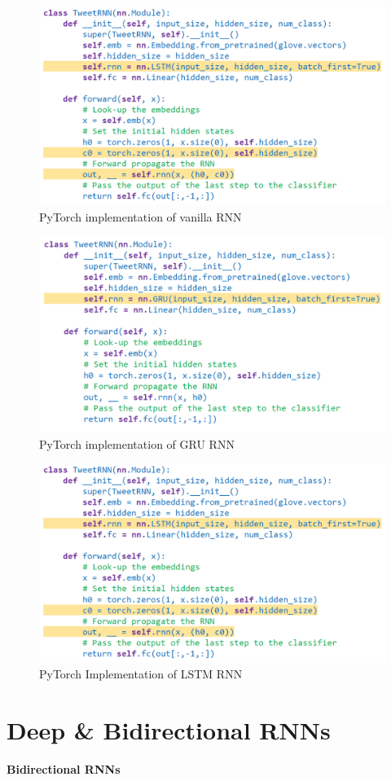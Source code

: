 \begin{figure}[h!t]
    \centering
    \includegraphics[width=0.65\linewidth]{lstmpy.png}
    \caption{PyTorch implementation of vanilla RNN}
    \label{fig:enter-label}
\end{figure}
\begin{figure}[h!t]
    \centering
    \includegraphics[width=0.65\linewidth]{grupy.png}
    \caption{PyTorch implementation of GRU RNN}
    \label{fig:enter-label}
\end{figure}
\begin{figure}[h!t]
    \centering
    \includegraphics[width=0.65\linewidth]{lstmpy.png}
    \caption{PyTorch Implementation of LSTM RNN}
    \label{fig:enter-label}
\end{figure}

\section{Deep \& Bidirectional RNNs}

\textbf{Bidirectional RNNs}


